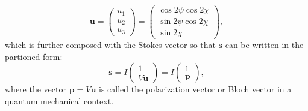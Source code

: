 \begin{equation}
    \bm{u}=
    \begin{pmatrix}
    u_1 \\
    u_2 \\
    u_3
    \end{pmatrix}
    =
    \begin{pmatrix}
    \cos 2\psi \cos 2\chi \\
    \sin 2\psi \cos 2\chi \\
    \sin 2\chi
    \end{pmatrix},
\end{equation}
which is further composed with the Stokes vector so that $\bm{s}$ can be written in the partioned form:
\begin{equation}
    \bm{s}=I
    \begin{pmatrix}
    1 \\
    V \bm{u}
    \end{pmatrix}
    =I
    \begin{pmatrix}
    1 \\
    \bm{p}
    \end{pmatrix},
\end{equation}
where the vector $\bm{p}=V\bm{u}$ is called the polarization vector or Bloch vector in a quantum mechanical context. 

\begin{figure}[h]
    \centering
    
    \caption{}
    \label{fig:poincare_sphere_intro}
\end{figure}

